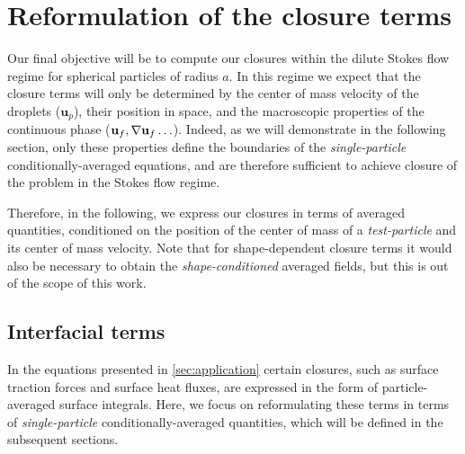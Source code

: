 \section{Reformulation of the closure terms}
\label{sec:reformulation}

Our final objective will be to compute our closures within the dilute Stokes flow regime for spherical particles of radius $a$. 
In this regime we expect that the closure terms will only be determined by the center of mass velocity of the droplets ($\textbf{u}_p$), their position in space, and the macroscopic properties of the continuous phase ($\textbf{u}_f, \mathbf{\nabla} \textbf{u}_f \ldots$). 
Indeed, as we will demonstrate in the following section, only these properties define the boundaries of the \textit{single-particle} conditionally-averaged equations, and are therefore sufficient to achieve closure of the problem  in the Stokes flow regime. 

Therefore, in the following, we express our closures in terms of averaged quantities, conditioned on the position of the center of mass of a \textit{test-particle} and its center of mass velocity. 
Note that for shape-dependent closure terms it would also be necessary to obtain the \textit{shape-conditioned} averaged fields, but this is out of the scope of this work.
  
\subsection{Interfacial terms}

In the equations presented in \ref{sec:application} certain closures, such as surface traction forces and surface heat fluxes, are expressed in the form of particle-averaged surface integrals. 
Here, we focus on reformulating these terms in terms of \textit{single-particle} conditionally-averaged quantities, which will be defined in the subsequent sections.

